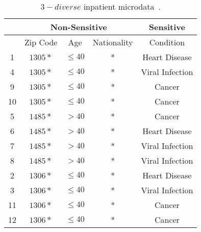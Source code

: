\begin{table}[htbp]
    \centering
    \begin{tabular}{|c||c|c|c||c|}
        \hline \multicolumn{1}{|c||}{} & \multicolumn{3}{c||}{ Non-Sensitive } & Sensitive                                 \\
        \hline                         & Zip Code                              & Age       & Nationality & Condition       \\
        \hline 1                       & $1305*$                               & $\leq 40$ & *           & Heart Disease   \\
        4                              & $1305*$                               & $\leq 40$ & *           & Viral Infection \\
        9                              & $1305*$                               & $\leq 40$ & *           & Cancer          \\
        10                             & $1305*$                               & $\leq 40$ & *           & Cancer          \\
        \hline 5                       & $1485*$                               & $>40$     & *           & Cancer          \\
        6                              & $1485*$                               & $>40$     & *           & Heart Disease   \\
        7                              & $1485*$                               & $>40$     & *           & Viral Infection \\
        8                              & $1485*$                               & $>40$     & *           & Viral Infection \\
        \hline 2                       & $1306*$                               & $\leq 40$ & *           & Heart Disease   \\
        3                              & $1306*$                               & $\leq 40$ & *           & Viral Infection \\
        11                             & $1306*$                               & $\leq 40$ & *           & Cancer          \\
        12                             & $1306*$                               & $\leq 40$ & *           & Cancer          \\
        \hline
    \end{tabular}
    \caption{$3-diverse$ inpatient microdata~\cite{machanavajjhala2007diversity}.}
    \label{tabular:3-diverseinpatientmicrodata}
\end{table}
\FloatBarrier

